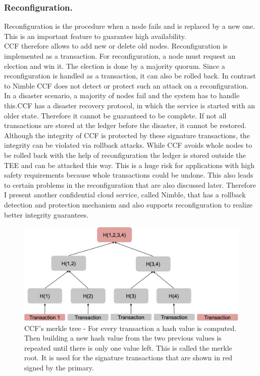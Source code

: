   \subsubsection*{Reconfiguration.}
  Reconfiguration is the procedure when a node fails and is replaced by a new one. This is an important feature to guarantee high availability.\\
CCF therefore allows to add new or delete old nodes. Reconfiguration is implemented as a transaction. For reconfiguration, a node must request an election and win it. The election is done by a majority quorum. Since a reconfiguration is handled as a transaction, it can also be rolled back. In contrast to Nimble CCF does not detect or protect such an attack on a reconfiguration.\\%
In a disaster scenario, a majority of nodes fail and the system has to handle this.CCF has a disaster recovery protocol, in which the service is started with an older state. Therefore it cannot be guaranteed to be complete. If not all transactions are stored at the ledger before the disaster, it cannot be restored. \\
  Although the integrity of CCF is protected by these signature transactions, the integrity can be violated via rollback attacks. While CCF avoids whole nodes to be rolled back with the help of reconfiguration the ledger is stored outside the TEE and can be attacked this way. This is a huge risk for applications with high safety requirements because whole transactions could be undone. This also leads to certain problems in the reconfiguration that are also discussed later. Therefore I present another confidential cloud service, called Nimble, that has a rollback detection and protection mechanism and also supports reconfiguration to realize better integrity guarantees.
 

\begin{figure}[t]
	\includegraphics[scale=0.18]{pictures/merkle_tree}
	\caption{CCF's merkle tree - For every transaction a hash value is computed. Then building a new hash value from the two previous values is repeated until there is only one value left. This is called the merkle root. It is used for the signature transactions that are shown in red signed by the primary.}
	\label{merkle}
\end{figure}



